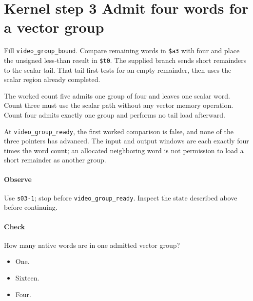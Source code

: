 \section{Kernel step 3 Admit four words for a vector group}
Fill \texttt{video\_group\_bound}. Compare remaining words in \texttt{\$a3} with four and place the unsigned less-than result in \texttt{\$t0}. The supplied branch sends short remainders to the scalar tail. That tail first tests for an empty remainder, then uses the scalar region already completed.

The worked count five admits one group of four and leaves one scalar word. Count three must use the scalar path without any vector memory operation. Count four admits exactly one group and performs no tail load afterward.

At \texttt{video\_group\_ready}, the first worked comparison is false, and none of the three pointers has advanced. The input and output windows are each exactly four times the word count; an allocated neighboring word is not permission to load a short remainder as another group.

\paragraph{Observe} Use \texttt{s03-1}; stop before \texttt{video\_group\_ready}. Inspect the state described above before continuing.

\paragraph{Check} How many native words are in one admitted vector group?
\begin{itemize}
  \item[A.] One.
  \item[B.] Sixteen.
  \item[C.] Four.
\end{itemize}
